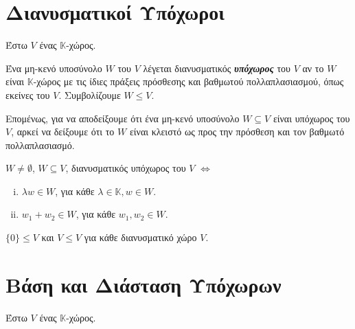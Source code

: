 








\renewcommand{\arraystretch}{1.2}

\begin{center}
  \minibox{\bfseries\Large \textcolor{Col1}{Γραμμική Άλγεβρα}}
\end{center}

\vspace{\baselineskip}

\setcounter{chapter}{1}

\section{Διανυσματικοί Υπόχωροι}

Έστω $V$ ένας $\mathbb{K}$-χώρος.

\begin{dfn}
Ένα μη-κενό υποσύνολο $W$ του $V$ λέγεται διανυσματικός \textbf{\textit{υπόχωρος}} του $V$ αν το $W$ είναι $\mathbb{K}$-χώρος με τις ίδιες πράξεις πρόσθεσης και βαθμωτού πολλαπλασιασμού, όπως εκείνες του $V$. Συμβολίζουμε $W\leq V$.
\end{dfn}

Επομένως, για να αποδείξουμε ότι ένα μη-κενό υποσύνολο $W\subseteq V$ είναι υπόχωρος του $V$, αρκεί να δείξουμε ότι το $W$ είναι κλειστό ως προς την πρόσθεση και τον βαθμωτό πολλαπλασιασμό.

\begin{prop}
$W\neq \emptyset$, $W\subseteq V$, διανυσματικός υπόχωρος του $V$ $\Leftrightarrow$
\begin{enumerate}[i.]
\item $\lambda w\in W$, για κάθε $\lambda\in \mathbb{K}, w\in W$.
\item $w_1+w_2\in W$, για κάθε $w_1, w_2\in W$.
\end{enumerate}
\end{prop}

\begin{prop}
$\{0\}\leq V$ και $V\leq V$ για κάθε διανυσματικό χώρο $V$.
\end{prop}

\section{Βάση και Διάσταση Υπόχωρων}

Έστω $V$ ένας $\mathbb{K}$-χώρος.


